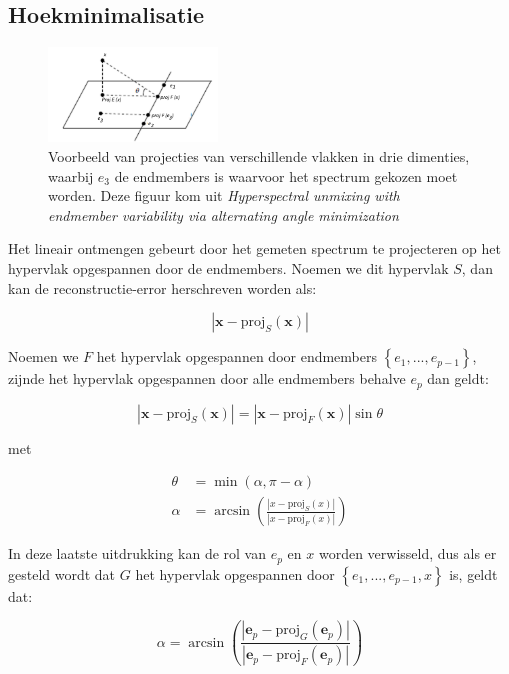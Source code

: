 \documentclass[12pt]{report}
\newcommand{\proj}[2]{\text{proj}_{#2}\left(#1\right)}
\begin{document}
\subsection{Hoekminimalisatie}

\begin{figure}
\includegraphics[width=0.4\textwidth]{AAMProj.PNG}
\caption{Voorbeeld van projecties van verschillende vlakken in drie dimenties, waarbij $e_3$ de endmembers is waarvoor het spectrum gekozen moet worden. Deze figuur kom uit \textit{Hyperspectral unmixing with endmember variability
via alternating angle minimization}\cite{mesma}}
\end{figure}

Het lineair ontmengen gebeurt door het gemeten spectrum te projecteren op het hypervlak opgespannen door de endmembers. Noemen we dit hypervlak $S$, dan kan de reconstructie-error herschreven worden als:

\begin{equation}
\left| \bm{x} - \proj{\bm{x}}{S}\right|
\end{equation}

Noemen we $F$ het hypervlak opgespannen door endmembers $\left\{ e_1 , ... , e_{p-1} \right\}$, zijnde het hypervlak opgespannen door alle endmembers behalve $e_p$ dan geldt:

\begin{equation}
\left| \bm{x} - \proj{\bm{x}}{S}\right|  = \left| \bm{x} - \proj{\bm{x}}{F}\right| \sin \theta
\end{equation}

met 

\begin{align}
\theta &= \min(\alpha, \pi-\alpha) \\
\alpha &= \arcsin \left(\frac{\left|x - \proj{x}{S}\right|}{\left|x - \proj{x}{F}\right|}\right)
\end{align}

In deze laatste uitdrukking kan de rol van $e_p$ en $x$ worden verwisseld, dus als er gesteld wordt dat $G$ het hypervlak opgespannen door $\left\{ e_1 , ... ,e_{p-1}, x \right\}$ is, geldt dat:

\begin{equation}
\alpha = \arcsin \left(\frac{\left|\bm{e}_p - \proj{\bm{e}_p}{G}\right|}{\left|\bm{e}_p - \proj{\bm{e}_p}{F}\right|}\right)
\end{equation} 
\end{document}
